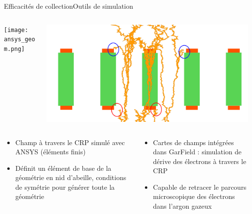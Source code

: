     \begin{frame}{Efficacités de collection}{Outils de simulation}
        \begin{scriptsize}
            \begin{columns}
                \begin{column}{0.5\textwidth}
                    \texttt{[image: ansys\_geom.png]}
                \end{column}\hfill
                \begin{column}{0.5\textwidth}
                    \includegraphics[width=\textwidth]{./pictures/losses_with_lem.png}
                \end{column}
            \end{columns}
            \begin{columns}
                \begin{column}{0.5\textwidth}
                    \begin{itemize}
                        \item Champ à travers le CRP simulé avec ANSYS (éléments finis)
                        \item Définit un élément de base de la géométrie en nid d'abeille, conditions de symétrie pour générer toute la géométrie
                    \end{itemize}
                \end{column}
                \begin{column}{0.5\textwidth}
                    \begin{itemize}
                        \item Cartes de champs intégrées dans GarField : simulation de dérive des électrons à travers le CRP
                        \item Capable de retracer le parcours microscopique des électrons dans l'argon gazeux
                    \end{itemize}
                \end{column}
            \end{columns}
        \end{scriptsize}
    \end{frame}
    

